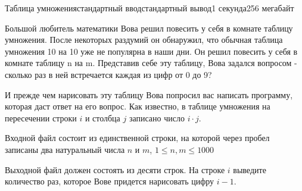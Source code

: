 \begin{problem}{Таблица умножения}{стандартный ввод}{стандартный вывод}{1 секунда}{256 мегабайт}

Большой любитель математики Вова решил повесить у себя в комнате таблицу умножения. После некоторых раздумий он обнаружил, что обычная таблица умножения 10 на 10 уже не популярна в наши дни. Он решил повесить у себя в комнате таблицу n на m. Представив себе эту таблицу, Вова задался вопросом - сколько раз в ней встречается каждая из цифр от 0 до 9?


И прежде чем нарисовать эту таблицу Вова попросил вас написать программу, которая даст ответ на его вопрос. 
Как известно, в таблице умножения на пересечении строки $i$ и столбца $j$ записано число $i \cdot j$. 

\InputFile
Входной файл состоит из единственной строки, на которой через пробел записаны два натуральный числа $n$ и $m$, $1 \le n, m \le 1000$

\OutputFile
Выходной файл должен состоять из десяти строк. На строке $i$ выведите количество раз, которое Вове придется нарисовать цифру $i - 1$.

\Example

\begin{example}
%
\end{example}

\end{problem}

